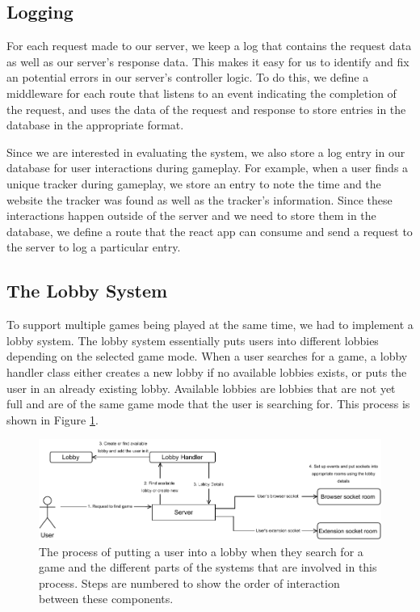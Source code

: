 \documentclass{l4proj}
\begin{document}
\subsection{Logging}
For each request made to our server, we keep a log that contains the request data as well as our server's response data. This makes it easy for us to identify and fix an potential errors in our server's controller logic. To do this, we define a middleware for each route that listens to an event indicating the completion of the request, and uses the data of the request and response to store entries in the database in the appropriate format.

Since we are interested in evaluating the system, we also store a log entry in our database for user interactions during gameplay. For example, when a user finds a unique tracker during gameplay, we store an entry to note the time and the website the tracker was found as well as the tracker's information. Since these interactions happen outside of the server and we need to store them in the database, we define a route that the react app can consume and send a request to the server to log a particular entry.

\subsection{The Lobby System}
To support multiple games being played at the same time, we had to implement a lobby system. The lobby system essentially puts users into different lobbies depending on the selected game mode. When a user searches for a game, a lobby handler class either creates a new lobby if no available lobbies exists, or puts the user in an already existing lobby. Available lobbies are lobbies that are not yet full and are of the same game mode that the user is searching for. This process is shown in Figure \ref{fig:lobby}.

\begin{figure}
    \centering
    \includegraphics[width=1\linewidth]{images/lobby.pdf}    

    \caption{The process of putting a user into a lobby when they search for a game and the different parts of the systems that are involved in this process. Steps are numbered to show the order of interaction between these components.}

    \label{fig:lobby} 
\end{figure}
\end{document}
